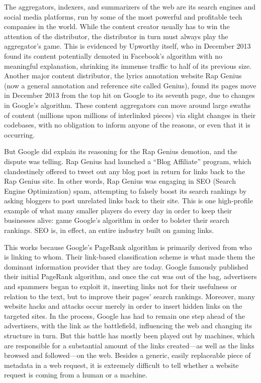 The aggregators, indexers, and summarizers of the web are its search engines and social media platforms, run by some of the most powerful and profitable tech companies in the world. While the content creator usually has to win the attention of the distributor, the distributor in turn must always play the aggregator's game. This is evidenced by Upworthy itself, who in December 2013 found its content potentially demoted in Facebook's algorithm with no meaningful explanation, shrinking its immense traffic to half of its previous size.\autocite{carlson_upworthy_2014} Another major content distributor, the lyrics annotation website Rap Genius (now a general annotation and reference site called Genius), found its pages move in December 2013 from the top hit on Google to its seventh page, due to changes in Google's algorithm.\autocite{constine_google_2013} These content aggregators can move around large swaths of content (millions upon millions of interlinked pieces) via slight changes in their codebases, with no obligation to inform anyone of the reasons, or even that it is occurring.

But Google did explain its reasoning for the Rap Genius demotion, and the dispute was telling. Rap Genius had launched a ``Blog Affiliate'' program, which clandestinely offered to tweet out any blog post in return for links back to the Rap Genius site. In other words, Rap Genius was engaging in SEO (Search Engine Optimization) spam, attempting to falsely boost its search rankings by asking bloggers to post unrelated links back to their site. This is one high-profile example of what many smaller players do every day in order to keep their businesses alive: game Google's algorithm in order to bolster their search rankings. SEO is, in effect, an entire industry built on gaming links.

This works because Google's PageRank algorithm is primarily derived from who is linking to whom. Their link-based classification scheme is what made them the dominant information provider that they are today. Google famously published their initial PageRank algorithm, and once the cat was out of the bag, advertisers and spammers began to exploit it, inserting links not for their usefulness or relation to the text, but to improve their pages' search rankings. Moreover, many website hacks and attacks occur merely in order to insert hidden links on the targeted sites. In the process, Google has had to remain one step ahead of the advertisers, with the link as the battlefield, influencing the web and changing its structure in turn. But this battle has mostly been played out by machines, which are responsible for a substantial amount of the links created---as well as the links browsed and followed---on the web. Besides a generic, easily replaceable piece of metadata in a web request, it is extremely difficult to tell whether a website request is coming from a human or a machine.

